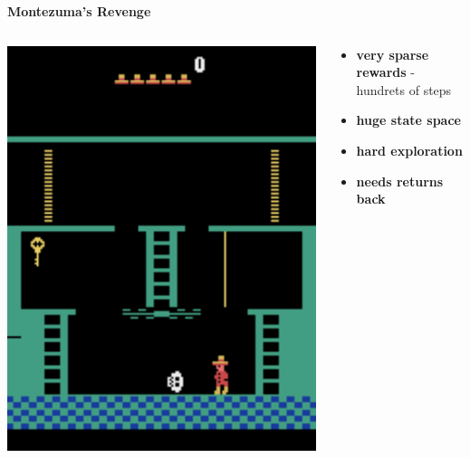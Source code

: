 \documentclass[xcolor=dvipsnames]{beamer}
\begin{document}
\begin{frame}{\bf Montezuma's Revenge}

  \begin{columns}

    \begin{column}{0.5\textwidth}
      \includegraphics[scale=0.32]{../images/montezuma.png}
    \end{column}

    \begin{column}{0.5\textwidth}
      \begin{itemize}
        \item {\bf very sparse rewards} - hundrets of steps
        \item {\bf huge state space}
        \item {\bf hard exploration}
        \item {\bf needs returns back}
      \end{itemize}
    \end{column}


  \end{columns}

\end{frame}
\end{document}
